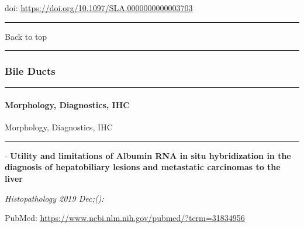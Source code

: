 \documentclass[
]{article}
\renewcommand{\linethickness}{0.05em}
\begin{document}
doi: \url{https://doi.org/10.1097/SLA.0000000000003703}

\begin{center}\rule{0.5\linewidth}{\linethickness}\end{center}

Back to top

\begin{center}\rule{0.5\linewidth}{\linethickness}\end{center}

\pagebreak

\hypertarget{bile-ducts}{%
\subsubsection{Bile Ducts}\label{bile-ducts}}

\begin{center}\rule{0.5\linewidth}{\linethickness}\end{center}

\hypertarget{morphology-diagnostics-ihc}{%
\paragraph{Morphology, Diagnostics,
IHC}\label{morphology-diagnostics-ihc}}

Morphology, Diagnostics, IHC

\begin{center}\rule{0.5\linewidth}{\linethickness}\end{center}

- \textbf{Utility and limitations of Albumin RNA in situ hybridization
in the diagnosis of hepatobiliary lesions and metastatic carcinomas to
the liver}

\emph{Histopathology 2019 Dec;():}

PubMed: \url{https://www.ncbi.nlm.nih.gov/pubmed/?term=31834956}
\end{document}
